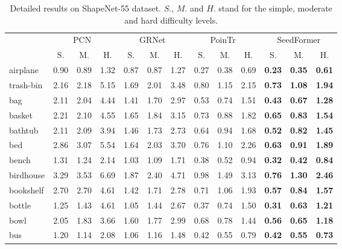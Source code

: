 \begin{table*}[t]
	\centering
\scriptsize
	\setlength{\tabcolsep}{4.5pt}
\caption{Detailed results on ShapeNet-55 dataset. $S.$, $M.$ and $H.$ stand for the simple, moderate and hard difficulty levels.}
	\vspace{5pt}
	\begin{tabular}{l|ccc|ccc|ccc|ccc}
		\toprule[1pt]
		 & \multicolumn{3}{c|}{PCN~\cite{yuan2018pcn}} & \multicolumn{3}{c|}{GRNet~\cite{xie2020grnet}} & \multicolumn{3}{c|}{PoinTr~\cite{yu2021pointr}} & \multicolumn{3}{c}{SeedFormer} \\
				& S. & M. & H. & S. & M. & H. & S. & M. & H. & S. & M. & H.\\
		\midrule[0.3pt]
		airplane 	   & 0.90 & 0.89 & 1.32 & 0.87 & 0.87 & 1.27 & 0.27 & 0.38 & 0.69 & \textbf{0.23} & \textbf{0.35} & \textbf{0.61} \\
		trash-bin 	   & 2.16 & 2.18 & 5.15 & 1.69 & 2.01 & 3.48 & 0.80 & 1.15 & 2.15 & \textbf{0.73} & \textbf{1.08} & \textbf{1.94} \\
		bag 		   & 2.11 & 2.04 & 4.44 & 1.41 & 1.70 & 2.97 & 0.53 & 0.74 & 1.51 & \textbf{0.43} & \textbf{0.67} & \textbf{1.28} \\
		basket 		   & 2.21 & 2.10 & 4.55 & 1.65 & 1.84 & 3.15 & 0.73 & 0.88 & 1.82 & \textbf{0.65} & \textbf{0.83} & \textbf{1.54} \\
		bathtub 	   & 2.11 & 2.09 & 3.94 & 1.46 & 1.73 & 2.73 & 0.64 & 0.94 & 1.68 & \textbf{0.52} & \textbf{0.82} & \textbf{1.45} \\
		bed 		   & 2.86 & 3.07 & 5.54 & 1.64 & 2.03 & 3.70 & 0.76 & 1.10 & 2.26 & \textbf{0.63} & \textbf{0.91} & \textbf{1.89} \\
		bench 		   & 1.31 & 1.24 & 2.14 & 1.03 & 1.09 & 1.71 & 0.38 & 0.52 & 0.94 & \textbf{0.32} & \textbf{0.42} & \textbf{0.84} \\
		birdhouse 	   & 3.29 & 3.53 & 6.69 & 1.87 & 2.40 & 4.71 & 0.98 & 1.49 & 3.13 & \textbf{0.76} & \textbf{1.30} & \textbf{2.46} \\
		bookshelf 	   & 2.70 & 2.70 & 4.61 & 1.42 & 1.71 & 2.78 & 0.71 & 1.06 & 1.93 & \textbf{0.57} & \textbf{0.84} & \textbf{1.57} \\
		bottle 		   & 1.25 & 1.43 & 4.61 & 1.05 & 1.44 & 2.67 & 0.37 & 0.74 & 1.50 & \textbf{0.31} & \textbf{0.63} & \textbf{1.21} \\
		bowl 		   & 2.05 & 1.83 & 3.66 & 1.60 & 1.77 & 2.99 & 0.68 & 0.78 & 1.44 & \textbf{0.56} & \textbf{0.65} & \textbf{1.18} \\
		bus 		   & 1.20 & 1.14 & 2.08 & 1.06 & 1.16 & 1.48 & 0.42 & 0.55 & 0.79 & \textbf{0.42} & \textbf{0.55} & \textbf{0.73} \\

\end{tabular}
\end{table*}
